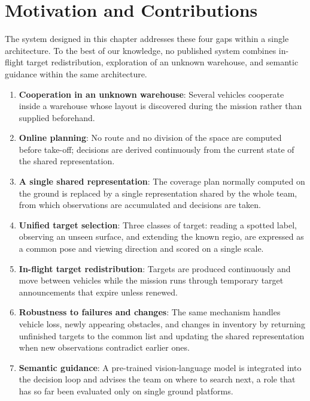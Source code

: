 \section{Motivation and Contributions}%
\label{sec:sys:motivation}

The system designed in this chapter addresses these four gaps within a single
architecture. To the best of our knowledge, no published system combines
in-flight target redistribution, exploration of an unknown warehouse, and
semantic guidance within the same architecture.

\begin{enumerate}[itemsep=0.5em]
\item \textbf{Cooperation in an unknown warehouse}:
Several vehicles cooperate inside a warehouse whose layout is discovered
during the mission rather than supplied beforehand.

\item \textbf{Online planning}:
      No route and no division of the space are computed before take-off;
      decisions are derived continuously from the current state of the shared
      representation.

\item \textbf{A single shared representation}:
      The coverage plan normally computed on the ground is replaced by a
      single representation shared by the whole team, from which observations
      are accumulated and decisions are taken.

\item \textbf{Unified target selection}:
      Three classes of target: reading a spotted label, observing an unseen
      surface, and extending the known regio, are expressed as a common
      pose and viewing direction and scored on a single scale.

\item \textbf{In-flight target redistribution}:
      Targets are produced continuously and move between vehicles while the
      mission runs through temporary target announcements that expire unless
      renewed.

\item \textbf{Robustness to failures and changes}:
      The same mechanism handles vehicle loss, newly appearing obstacles, and
      changes in inventory by returning unfinished targets to the common list
      and updating the shared representation when new observations contradict
      earlier ones.

\item \textbf{Semantic guidance}:
      A pre-trained vision-language model is integrated into the decision loop
      and advises the team on where to search next, a role that has so far
      been evaluated only on single ground platforms.


\end{enumerate}
